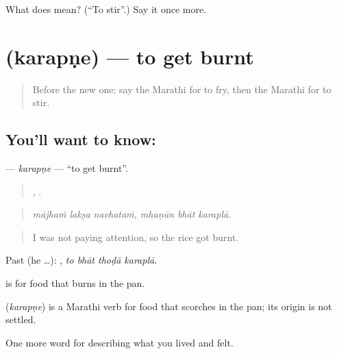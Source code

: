 \begin{tcolorbox}[breakable,colback=teal!4,colframe=teal!35!black,title={Before you move on}]
What does  mean? (\textquotedblleft{}To stir\textquotedblright{}.) Say it once more.
\end{tcolorbox}
\section[\texorpdfstring{\mr{करपणे} (karapṇe)}{करपणे (karapṇe)}]{ (karapṇe) — to get burnt}

\label{lesson:MR-C527-karapne}



\begin{quote}
Before the new one: say the Marathi for to fry, then the Marathi for to stir.
\end{quote}

\subsection*{You'll want to know: }
\textbf{} — \emph{karapṇe} — \textquotedblleft{}to get burnt\textquotedblright{}.

\begin{quote}
  ,   .
\end{quote}

\begin{quote}
\emph{mājhaṁ lakṣa navhataṁ, mhaṇūn bhāt karaplā.}
\end{quote}

\begin{quote}
I was not paying attention, so the rice got burnt.
\end{quote}

Past (he …):    , \emph{to bhāt thoḍā karaplā}.

 is for food that burns in the pan.

\begin{cousinweb}
\textbf{} (\emph{karapṇe}) is a Marathi verb for food that scorches in the pan; its origin is not settled.
\end{cousinweb}

\begin{grammarlens}[title={What you've built}]
One more word for describing what you lived and felt.
\end{grammarlens}

